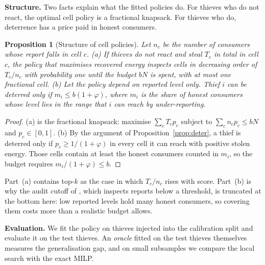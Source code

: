 \documentclass[journal]{IEEEtran}
\newtheorem{proposition}{Proposition}
\begin{document}
\textbf{Structure.} Two facts explain what the fitted policies do. For thieves who do not react, the optimal cell policy is a fractional knapsack. For thieves who do, deterrence has a price paid in honest consumers.
\begin{proposition}[Structure of cell policies]\label{prop:cells}
Let $n_c$ be the number of consumers whose report falls in cell $c$.
(a) If thieves do not react and steal $T_c$ in total in cell $c$, the policy that maximises recovered energy inspects cells in decreasing order of $T_c/n_c$ with probability one until the budget $bN$ is spent, with at most one fractional cell.
(b) Let the policy depend on reported level only. Thief $i$ can be deterred only if $m_i\le b(1+\varphi)$, where $m_i$ is the share of honest consumers whose level lies in the range that $i$ can reach by under-reporting.
\end{proposition}
\begin{proof}
(a) is the fractional knapsack: maximise $\sum_cT_cp_c$ subject to $\sum_cn_cp_c\le bN$ and $p_c\in[0,1]$. (b) By the argument of Proposition~\ref{prop:deter}, a thief is deterred only if $p_c\ge1/(1+\varphi)$ in every cell it can reach with positive stolen energy. Those cells contain at least the honest consumers counted in $m_i$, so the budget requires $m_i/(1+\varphi)\le b$.
\end{proof}
Part~(a) contains top-$k$ as the case in which $T_c/n_c$ rises with score. Part~(b) is why the audit cutoff of \cite{reinganum1985,border1987}, which inspects reports below a threshold, is truncated at the bottom here: low reported levels hold many honest consumers, so covering them costs more than a realistic budget allows.

\textbf{Evaluation.} We fit the policy on thieves injected into the calibration split and evaluate it on the test thieves. An \emph{oracle} fitted on the test thieves themselves measures the generalisation gap, and on small subsamples we compare the local search with the exact MILP.
\end{document}
